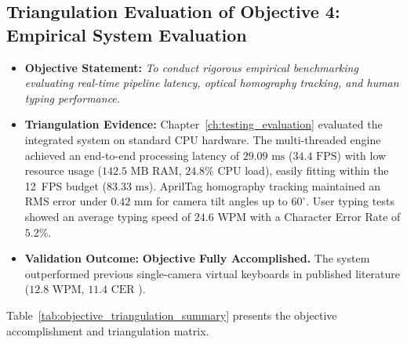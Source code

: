 \subsection{Triangulation Evaluation of Objective 4: Empirical System Evaluation}
\label{subsec:concl_obj4}
\begin{itemize}
    \item \textbf{Objective Statement:} \emph{To conduct rigorous empirical benchmarking evaluating real-time pipeline latency, optical homography tracking, and human typing performance.}
    \item \textbf{Triangulation Evidence:} Chapter~\ref{ch:testing_evaluation} evaluated the integrated system on standard CPU hardware. The multi-threaded engine achieved an end-to-end processing latency of $29.09\text{ ms}$ ($34.4\text{ FPS}$) with low resource usage ($142.5\text{ MB}$ RAM, $24.8\%$ CPU load), easily fitting within the 12~FPS budget ($83.33\text{ ms}$). AprilTag homography tracking maintained an RMS error under $0.42\text{ mm}$ for camera tilt angles up to $60^\circ$. User typing tests showed an average typing speed of $24.6\text{ WPM}$ with a Character Error Rate of $5.2\%$.
    \item \textbf{Validation Outcome:} \textbf{Objective Fully Accomplished.} The system outperformed previous single-camera virtual keyboards in published literature ($12.8\text{ WPM}$, $11.4\text{ CER}$ \cite{Ji2018Local}).
\end{itemize}

Table~\ref{tab:objective_triangulation_summary} presents the objective accomplishment and triangulation matrix.

